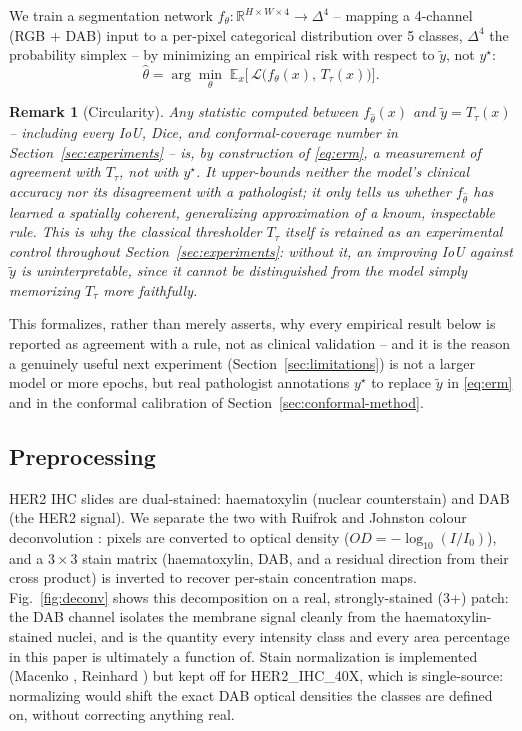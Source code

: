 \documentclass[conference]{IEEEtran}
\newtheorem{remark}{Remark}
\begin{document}
We train a segmentation network $f_\theta: \mathbb{R}^{H\times W\times 4}
\to \Delta^{4}$ -- mapping a 4-channel (RGB + DAB) input to a per-pixel
categorical distribution over 5 classes, $\Delta^4$ the probability simplex
-- by minimizing an empirical risk with respect to $\tilde y$, not
$y^\star$:
\begin{equation}
\hat\theta = \arg\min_\theta \; \mathbb{E}_{x}\Big[\, \mathcal{L}\big(f_\theta(x),\, T_\tau(x)\big) \Big].
\label{eq:erm}
\end{equation}
\begin{remark}[Circularity]
\label{rem:circularity}
Any statistic computed between $f_{\hat\theta}(x)$ and $\tilde y = T_\tau(x)$
-- including every IoU, Dice, and conformal-coverage number in
Section~\ref{sec:experiments} -- is, by construction of
\eqref{eq:erm}, a measurement of agreement with $T_\tau$, not with
$y^\star$. It upper-bounds neither the model's clinical accuracy nor its
disagreement with a pathologist; it only tells us whether $f_{\hat\theta}$
has learned a spatially coherent, generalizing approximation of a known,
inspectable rule. This is why the classical thresholder $T_\tau$ itself is
retained as an experimental control throughout Section~\ref{sec:experiments}:
without it, an improving IoU against $\tilde y$ is uninterpretable, since it
cannot be distinguished from the model simply memorizing $T_\tau$ more
faithfully.
\end{remark}
This formalizes, rather than merely asserts, why every empirical result
below is reported as agreement with a rule, not as clinical validation --
and it is the reason a genuinely useful next experiment
(Section~\ref{sec:limitations}) is not a larger model or more epochs, but
real pathologist annotations $y^\star$ to replace $\tilde y$ in
\eqref{eq:erm} and in the conformal calibration of
Section~\ref{sec:conformal-method}.

\subsection{Preprocessing}
\label{sec:preprocessing}

HER2 IHC slides are dual-stained: haematoxylin (nuclear counterstain) and
DAB (the HER2 signal). We separate the two with Ruifrok and Johnston colour
deconvolution \cite{ruifrok2001}: pixels are converted to optical density
($OD = -\log_{10}(I/I_0)$), and a $3\times3$ stain matrix (haematoxylin,
DAB, and a residual direction from their cross product) is inverted to
recover per-stain concentration maps. Fig.~\ref{fig:deconv} shows this
decomposition on a real, strongly-stained (3+) patch: the DAB channel
isolates the membrane signal cleanly from the haematoxylin-stained nuclei,
and is the quantity every intensity class and every area percentage in
this paper is ultimately a function of. Stain normalization is implemented
(Macenko \cite{macenko2009}, Reinhard \cite{reinhard2001}) but kept off for
HER2\_IHC\_40X, which is single-source: normalizing would shift the exact
DAB optical densities the classes are defined on, without correcting
anything real.
\end{document}
